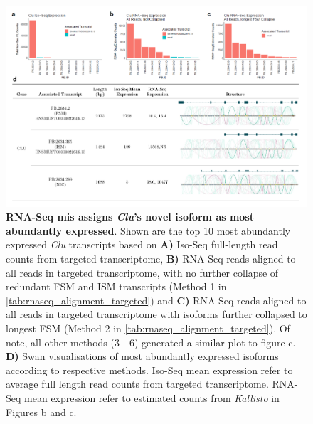 \begin{landscape}
	\begin{figure}[htp]
		\centering
		\includegraphics[page=1,trim={0cm 1cm 0cm 0cm},clip,scale = 0.8]{Figures/ProjectDevelopment_Figures_Landscape.pdf}
		\captionsetup{width=1.2\textwidth,singlelinecheck=off}
		\caption[RNA-Seq mis assignment of dominant isoform associated with \textit{Clu}]%
		{\textbf{RNA-Seq mis assigns \textit{Clu}'s novel isoform as most abundantly expressed}. Shown are the top 10 most abundantly expressed \textit{Clu} transcripts based on \textbf{A)} Iso-Seq full-length read counts from targeted transcriptome, \textbf{B)} RNA-Seq reads aligned to all reads in targeted transcriptome, with no further collapse of redundant FSM and ISM transcripts (Method 1 in \cref{tab:rnaseq_alignment_targeted}) and \textbf{C)} RNA-Seq reads aligned to all reads in targeted transcriptome with isoforms further collapsed to longest FSM (Method 2 in \cref{tab:rnaseq_alignment_targeted}). Of note, all other methods (3 - 6) generated a similar plot to figure c. \textbf{D)} Swan visualisations of most abundantly expressed isoforms according to respective methods. Iso-Seq mean expression refer to average full length read counts from targeted transcriptome. RNA-Seq mean expression refer to estimated counts from \textit{Kallisto} in Figures b and c. 
		}
		\label{fig:Clu_TargetedRNAseqAlignment}
	\end{figure}
	

\end{landscape}

